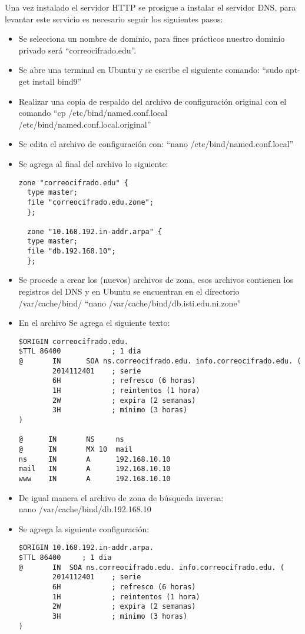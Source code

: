 \documentclass[12pt,oneside,onecolumn,openany]{report}
\begin{document}
Una vez instalado el servidor HTTP se prosigue a instalar el servidor DNS, para levantar este servicio es necesario seguir los siguientes pasos:
\begin{itemize}
 \item Se selecciona un nombre de dominio, para fines prácticos nuestro dominio privado será “correocifrado.edu”.
 \item Se abre una terminal en Ubuntu y se escribe el siguiente comando: “sudo apt-get install bind9”
 \item Realizar una copia de respaldo del archivo de configuración original con el comando “cp /etc/bind/named.conf.local \\ /etc/bind/named.conf.local.original”
 \item Se edita el archivo de configuración con: “nano /etc/bind/named.conf.local”
 \item Se agrega al final del archivo lo siguiente:
 \begin{lstlisting}[frame=single]
  zone "correocifrado.edu" {
  type master;
  file "correocifrado.edu.zone";
  };

  zone "10.168.192.in-addr.arpa" {
  type master;
  file "db.192.168.10";
  };
 \end{lstlisting}
 \item Se procede a crear los (nuevos) archivos de zona, esos archivos contienen los registros del DNS y en Ubuntu se encuentran en el directorio /var/cache/bind/ “nano /var/cache/bind/db.isti.edu.ni.zone”
 \item En el archivo Se agrega el siguiente texto:
 \begin{lstlisting}[frame=single]
  $ORIGIN correocifrado.edu.
$TTL 86400            ; 1 dia
@       IN      SOA ns.correocifrado.edu. info.correocifrado.edu. (
        2014112401    ; serie
        6H            ; refresco (6 horas)
        1H            ; reintentos (1 hora)
        2W            ; expira (2 semanas)
        3H            ; mínimo (3 horas)
)

@      IN       NS     ns
@      IN       MX 10  mail
ns     IN       A      192.168.10.10
mail   IN       A      192.168.10.10
www    IN       A      192.168.10.10
 \end{lstlisting}
 \item De igual manera el archivo de zona de búsqueda inversa:\\
  nano /var/cache/bind/db.192.168.10
  \item Se agrega la siguiente configuración:    
  \begin{lstlisting}[frame=single]
   $ORIGIN 10.168.192.in-addr.arpa.
$TTL 86400     ; 1 dia
@       IN  SOA ns.correocifrado.edu. info.correocifrado.edu. (
        2014112401    ; serie
        6H            ; refresco (6 horas)
        1H            ; reintentos (1 hora)
        2W            ; expira (2 semanas)
        3H            ; mínimo (3 horas)
)


\end{lstlisting}
\end{itemize}
\end{document}
